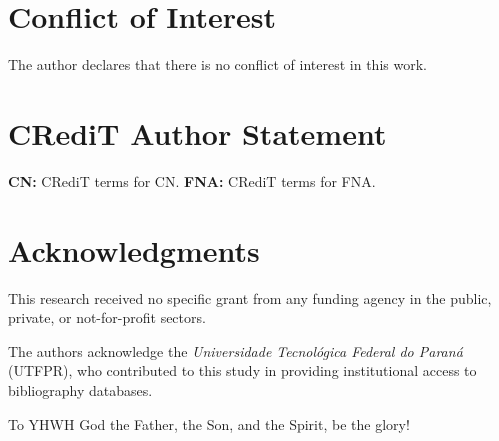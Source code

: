 
\section*{Conflict of Interest}

    The author declares that there is no conflict of interest in this work.



\section*{CRediT Author Statement}

    \textbf{CN:} CRediT terms for CN. \textbf{FNA:} CRediT terms for FNA.



\section*{Acknowledgments}

    This research received no specific grant from any funding agency in the public, private,  or
    not-for-profit sectors.

    The authors acknowledge the \textit{Universidade Tecnológica Federal do Paraná} (UTFPR), who
    contributed to this study in providing institutional access to bibliography databases.

    To YHWH God the Father, the Son, and the Spirit, be the glory!





